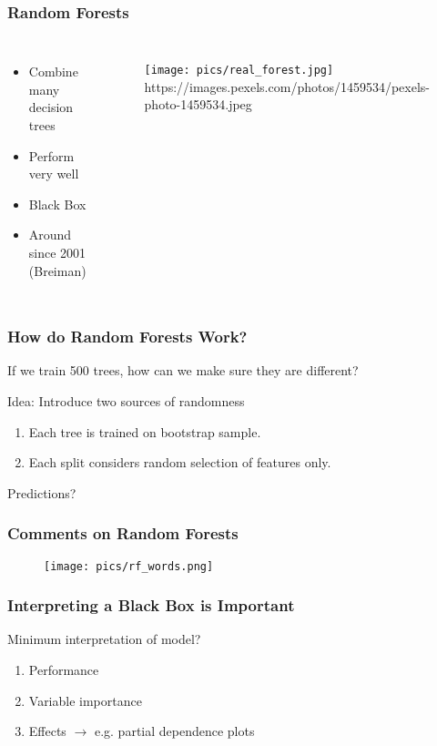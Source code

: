 \documentclass[
    utf8,
    aspectratio=169
]{beamer}  %
\begin{document}
\begin{frame}
	\frametitle{Random Forests}
	\begin{columns}[onlytextwidth]
		\begin{itemize}
			\item Combine many decision trees
			\item Perform very well
			\item Black Box
			\item Around since 2001 (Breiman)
		\end{itemize}
		
		\begin{figure}
			\texttt{[image: pics/real\_forest.jpg]}
			\tiny{https://images.pexels.com/photos/1459534/pexels-photo-1459534.jpeg}
		\end{figure}
	\end{columns}
\end{frame}

\begin{frame}
	\frametitle{How do Random Forests Work?}
	If we train 500 trees, how can we make sure they are different? 
	
	\vfill
	
	\begin{block}{Idea: Introduce two sources of randomness}
		\begin{enumerate}
			\item Each tree is trained on bootstrap sample.
			\item Each split considers random selection of features only.
		\end{enumerate}
	\end{block}

	\vfill

	Predictions? 
\end{frame}

\begin{frame}
	\frametitle{Comments on Random Forests}
	\begin{figure}
		\texttt{[image: pics/rf\_words.png]}
	\end{figure}
	\begin{example}
	\end{example}
\end{frame}

\begin{frame}
	\frametitle{Interpreting a Black Box is Important}
	\begin{block}{Minimum interpretation of model?}
		\begin{enumerate}
			\item Performance
			\item Variable importance
			\item Effects $\rightarrow$ e.g. partial dependence plots
		\end{enumerate}
	\end{block}

	\vfill
	
	\begin{example}
	\end{example}
\end{frame}
\end{document}
